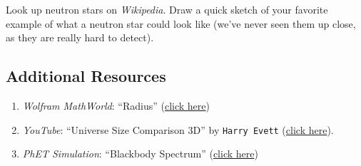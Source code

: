 \documentclass{article}
\numberwithin{equation}{section}
\numberwithin{figure}{section}
\begin{document}
\begin{exercise} \label{gkUxJg}
    Look up neutron stars on \textit{Wikipedia}. Draw a quick sketch of your favorite example of what a neutron star could look like (we've never seen them up close, as they are really hard to detect).
\end{exercise}


























\clearpage
\printnoidxglossaries

\clearpage
\subsection{Additional Resources}

\begin{enumerate}
    \item \textit{Wolfram MathWorld}: ``Radius'' (\href{https://mathworld.wolfram.com/Radius.html}{click here})
    \item \textit{YouTube}: ``Universe Size Comparison 3D'' by \texttt{Harry Evett} (\href{https://youtu.be/i93Z7zljQ7I}{click here}).
    \item \textit{PhET Simulation}: ``Blackbody Spectrum'' (\href{https://phet.colorado.edu/en/simulations/blackbody-spectrum}{click here})
\end{enumerate}
\end{document}
